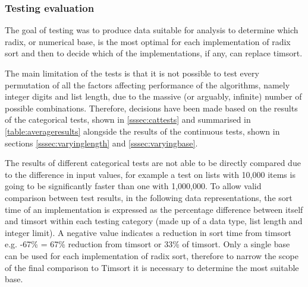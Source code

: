 \documentclass[12pt]{article}
\begin{document}
	\subsubsection{Testing evaluation}
	The goal of testing was to produce data suitable for analysis to determine which radix, or numerical base, is the most optimal for each implementation of radix sort and then to decide which of the implementations, if any, can replace timsort.	
	\par
	The main limitation of the tests is that it is not possible to test every permutation of all the factors affecting performance of the algorithms, namely integer digits and list length, due to the massive (or arguably, infinite) number of possible combinations. Therefore, decisions have been made based on the results of the categorical tests, shown in \ref{sssec:cattests} and summarised in \autoref{table:averageresults} alongside the results of the continuous tests, shown in sections \ref{sssec:varyinglength} and \ref{sssec:varyingbase}.
	\par 
	The results of different categorical tests are not able to be directly compared due to the difference in input values, for example a test on lists with 10,000 items is going to be significantly faster than one with 1,000,000. To allow valid comparison between test results, in the following data representations, the sort time of an implementation is expressed as the percentage difference between itself and timsort within each testing category (made up of a data type, list length and integer limit). A negative value indicates a reduction in sort time from timsort e.g. -67\% = 67\% reduction from timsort or 33\% of timsort.
	Only a single base can be used for each implementation of radix sort, therefore to narrow the scope of the final comparison to Timsort it is necessary to determine the most suitable base. 
\end{document}

